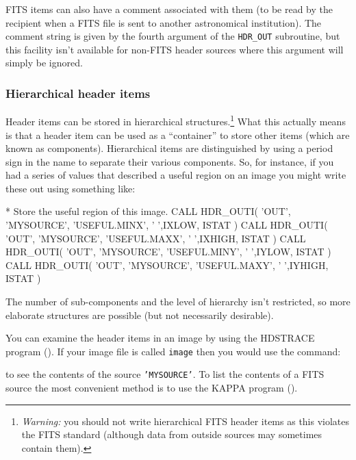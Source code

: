 \documentclass[twoside,11pt,nolof]{starlink}
\providecommand{\myverb}[1]{{\texttt{#1}}}
\newenvironment{code}{\begin{small}}
                     {\end{small}}
\begin{document}
FITS items can also have a comment associated with them (to be read by
the recipient when a FITS file is sent to another astronomical
institution). The comment string is given by the fourth argument of
the \myverb{HDR\_OUT} subroutine, but this facility isn't available
for non-FITS header sources where this argument will simply be
ignored.


\subsubsection{Hierarchical header items}

Header items can be stored in hierarchical structures.\footnote{ \emph{Warning:} you should not write hierarchical FITS header items as this
violates the FITS standard (although data from outside sources may
sometimes contain them).}  What this actually means is that a header
item can be used as a ``container'' to store other items (which are
known as components). Hierarchical items are distinguished by using a
period sign in the name to separate their various components. So, for
instance, if you had a series of values that described a useful region
on an image you might write these out using something like:
\begin{code}
\begin{terminalv}
*  Store the useful region of this image.
      CALL HDR_OUTI( 'OUT', 'MYSOURCE', 'USEFUL.MINX', ' ',IXLOW, ISTAT )
      CALL HDR_OUTI( 'OUT', 'MYSOURCE', 'USEFUL.MAXX', ' ',IXHIGH, ISTAT )
      CALL HDR_OUTI( 'OUT', 'MYSOURCE', 'USEFUL.MINY', ' ',IYLOW, ISTAT )
      CALL HDR_OUTI( 'OUT', 'MYSOURCE', 'USEFUL.MAXY', ' ',IYHIGH, ISTAT )
\end{terminalv}
\end{code}
The number of sub-components and the level of hierarchy isn't
restricted, so more elaborate structures are possible (but not
necessarily desirable).

You can examine the header items in an image by using the HDSTRACE program
(). If your image file is called
\myverb{image} then you would use the command:
\begin{code}
\begin{terminalv}
\end{terminalv}
\end{code}
to see the contents of the source \myverb{'MYSOURCE'}. To list the
contents of a FITS source the most convenient method is to use the
KAPPA program 
().
\end{document}
